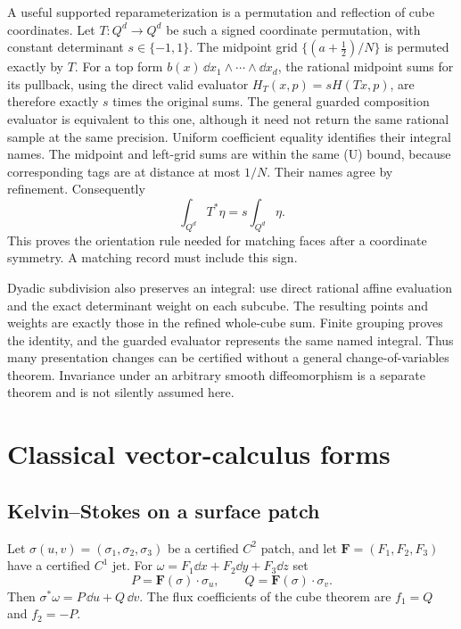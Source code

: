 A useful supported reparameterization is a permutation and reflection
of cube coordinates. Let $T:Q^d\to Q^d$ be such a signed coordinate
permutation, with constant determinant $s\in\{-1,1\}$. The midpoint
grid $\{(a+\tfrac12)/N\}$ is permuted exactly by $T$. For a top form
$b(x)\,\dd x_1\wedge\cdots\wedge\dd x_d$, the rational midpoint sums
for its pullback, using the direct valid evaluator
$H_T(x,p)=sH(Tx,p)$, are therefore exactly $s$ times the original sums.
The general guarded composition evaluator is equivalent to this one,
although it need not return the same rational sample at the same
precision. Uniform coefficient equality identifies their integral names.
The midpoint and left-grid sums are within the same (U) bound,
because corresponding tags are at distance at most $1/N$.
Their names agree by refinement. Consequently
\[
 \int_{Q^d}T^*\eta=s\int_{Q^d}\eta.
\]
This proves the orientation rule needed for matching faces after a
coordinate symmetry. A matching record must include this sign.

Dyadic subdivision also preserves an integral: use direct rational affine
evaluation and the exact determinant weight on each subcube. The
resulting points and weights are exactly those in the refined whole-cube
sum. Finite grouping proves the identity, and the guarded evaluator
represents the same named integral. Thus many
presentation changes can be certified without a general
change-of-variables theorem. Invariance under an arbitrary smooth
diffeomorphism is a separate theorem and is not silently assumed here.

\section{Classical vector-calculus forms}\label{sec:vector}

\subsection{Kelvin--Stokes on a surface patch}

Let $\sigma(u,v)=(\sigma_1,\sigma_2,\sigma_3)$ be a certified $C^2$ patch,
and let $\mathbf F=(F_1,F_2,F_3)$ have a certified $C^1$ jet.
For $\omega=F_1\dd x+F_2\dd y+F_3\dd z$ set
\[
 P=\mathbf F(\sigma)\cdot\sigma_u,\qquad
 Q=\mathbf F(\sigma)\cdot\sigma_v.
\]
Then $\sigma^*\omega=P\,\dd u+Q\,\dd v$. The flux coefficients of
the cube theorem are $f_1=Q$ and $f_2=-P$.

